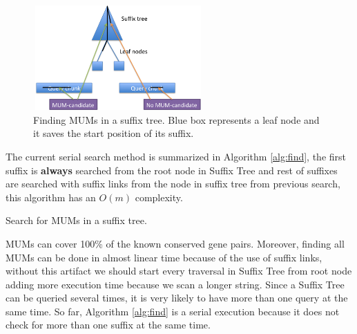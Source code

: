 \documentclass[conference]{IEEEtran}
\begin{document}
 \begin{figure}[htb]  
 \begin{center} 
  \includegraphics[width=6.5cm,height=4cm]{MUM-candidates.png}
 \end{center} 
 \caption{Finding MUMs in a suffix tree. Blue box represents a leaf node and it saves the start position of its suffix.} 
 \label{candidates} 
 \end{figure}  
 
 The current serial search method is summarized in Algorithm \ref{alg:find}, the first suffix is \textbf{always} searched from the root node in Suffix Tree and rest of suffixes are searched with suffix links from the node in suffix tree from previous search, this algorithm has an $O(m)$ complexity.
\begin{algorithm}[htb]
  \label{alg:find}
  \Input{\R, \Q, \Len}
  \caption{Search for MUMs in a suffix tree.}
\end{algorithm}
 MUMs can cover 100\% of the known  conserved gene pairs. Moreover, finding all MUMs  can be done in almost linear time because of the use of suffix links, without this artifact we should start every traversal in Suffix Tree from root node adding more execution time because we scan a longer string. Since a Suffix Tree can be queried several times, it is very likely to have more than one query  at the same time. So far, Algorithm \ref{alg:find} is a serial execution because it does not check for more than one suffix at the same time.
 
\end{document}
